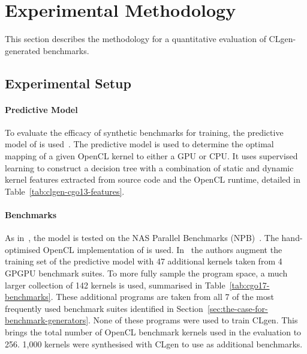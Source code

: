 \section{Experimental Methodology}
\label{sec:clgen-eval-methodology}

This section describes the methodology for a quantitative evaluation of CLgen-generated benchmarks.

\subsection{Experimental Setup}

\paragraph*{Predictive Model}

To evaluate the efficacy of synthetic benchmarks for training, the predictive model of \citeauthor{Grewe2013} is used~\cite{Grewe2013}. The predictive model is used to determine the optimal mapping of a given OpenCL kernel to either a GPU or CPU. It uses supervised learning to construct a decision tree with a combination of static and dynamic kernel features extracted from source code and the OpenCL runtime, detailed in Table~\ref{tab:clgen-cgo13-features}.

\begin{table}
	\centering%
	\caption[\citeauthor{Grewe2013} features for heterogeneous device mapping]{%
		Features used by \citeauthor{Grewe2013} to predict CPU/GPU mapping of OpenCL kernels. The features are extracted using a custom analysis pass built using LLVM.
	}%
	\label{tab:clgen-cgo13-features} %
\end{table}

\paragraph*{Benchmarks}

As in~\cite{Grewe2013}, the model is tested on the NAS Parallel Benchmarks (NPB)~\cite{Bailey1991a}. The hand-optimised OpenCL implementation of \citeauthor{Seo2011} \cite{Seo2011} is used. In~\cite{Grewe2013} the authors augment the training set of the predictive model with 47 additional kernels taken from 4 GPGPU benchmark suites. To more fully sample the program space, a much larger collection of 142 kernels is used, summarised in Table~\ref{tab:cgo17-benchmarks}. These additional programs are taken from all 7 of the most frequently used benchmark suites identified in Section~\ref{sec:the-case-for-benchmark-generators}. None of these programs were used to train CLgen. This brings the total number of OpenCL benchmark kernels used in the evaluation to 256. 1,000 kernels were synthesised with CLgen to use as additional benchmarks.

